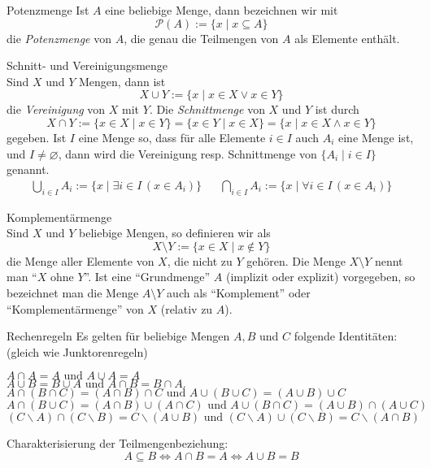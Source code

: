 \begin{definition}{Potenzmenge}
Ist $A$ eine beliebige Menge, dann bezeichnen wir mit
\[
 \mathcal{P}(A):=\{x\mid x\subseteq A\}
\]
die \textit{Potenzmenge} von $A$, die genau die Teilmengen von $A$ als Elemente enthält.
\end{definition}

\begin{definition}{Schnitt- und Vereinigungsmenge}\\
Sind $X$ und $Y$ Mengen, dann ist
\[
X\cup Y:=\{x\mid x\in X\lor x\in Y \}
\]
die \textit{Vereinigung} von $X$ mit $Y$. Die \textit{Schnittmenge} von $X$ und $Y$ ist durch
\[
X\cap Y:=\{x\in X\mid x\in Y \}=\{x\in Y\mid x\in X\}=\{x\mid x\in X\land x\in Y\}
\]
gegeben. Ist $I$ eine Menge so, dass für alle Elemente $i\in I$ auch $A_i$ eine Menge ist, und $I\neq\varnothing$, dann wird die Vereinigung resp. Schnittmenge von $\{A_i\mid i\in I\}$ genannt.
\begin{align*}
    \bigcup_{i\in I}A_i:=\{x\mid\exists i\in I\,(x\in A_i) \} & & \bigcap_{i\in I}A_i:=\{x\mid\forall i\in I\,(x\in A_i) \}
\end{align*}
\end{definition}

\begin{definition}{Komplementärmenge}\\
 Sind $X$ und $Y$ beliebige Mengen, so definieren wir als
 \[
 X\setminus Y:=\{x\in X\mid x\notin Y\}
 \]
die Menge aller Elemente von $X$, die nicht zu $Y$ gehören. Die Menge $X\setminus Y$ nennt man ``$X$ ohne $Y$''. Ist eine ``Grundmenge'' $A$ (implizit oder explizit) vorgegeben, so bezeichnet man die Menge $A\setminus Y$ auch als ``Komplement'' oder ``Komplementärmenge'' von $X$ (relativ zu $A$).
\end{definition}

\begin{lemma}{Rechenregeln}
 Es gelten für beliebige Mengen $A,B$ und $C$ folgende Identitäten: (gleich wie Junktorenregeln)
\begin{center}
    $A\cap A=A\text{ und }A\cup A=A$\\
    $A\cup B=B\cup A\text{ und }A\cap B=B\cap A.$\\
    $A\cap(B\cap C)=(A\cap B)\cap C\text{ und }A\cup(B\cup C)=(A\cup B)\cup C$\\
    $A\cap(B\cup C)=(A\cap B)\cup (A\cap C)\text{ und }A\cup(B\cap C)=(A\cup B)\cap (A\cup C)$\\
    $(C\backslash A)\cap (C\backslash B)=C\backslash (A\cup B)\text{ und }(C\backslash A)\cup (C\backslash B)=C\backslash (A\cap B)$
\end{center}
Charakterisierung der Teilmengenbeziehung:
\[
A\subseteq B\Leftrightarrow A\cap B= A\Leftrightarrow A\cup B=B
\]
\end{lemma}



